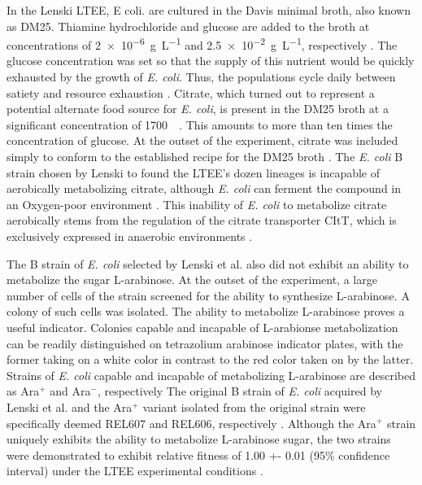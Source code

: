In the Lenski LTEE, E coli. are cultured in the Davis minimal broth, also known as DM25. 
Thiamine hydrochloride and glucose are added to the broth at 
concentrations of \SI{2e-6}{\gram\per\liter} and \SI{2.5e-2}{\gram\per\liter}, respectively \cite{Lenski1991Long-TermGenerations}. 
The glucose concentration was set so that the supply of this nutrient would be quickly exhausted by the growth of \textit{E. coli}.
Thus, the populations cycle daily between satiety and resource exhaustion \cite{Blount2016AContingency}.
Citrate, which turned out to represent a potential alternate food source for \textit{E. coli}, is present in the DM25 broth at a significant concentration of \SI{1700}{\micro\Molar}.
This amounts to more than ten times the concentration of glucose.
At the outset of the experiment, citrate was included simply  to conform to the established recipe for the DM25 broth \cite{Blount2016AContingency}.
The \textit{E. coli} B strain chosen by Lenski to found the LTEE's dozen lineages is incapable of aerobically metabolizing citrate, although \textit{E. coli} can ferment the compound in an Oxygen-poor environment \cite{Blount2016AContingency}.
This inability of \textit{E. coli} to metabolize citrate aerobically stems from the regulation of the citrate transporter CItT, which is exclusively expressed in anaerobic environments \cite{Pos1998TheChloroplasts}.

The B strain of \textit{E. coli} selected by Lenski et al. also did not exhibit an ability to metabolize the sugar L-arabinose.
At the outset of the experiment, a large number of cells of the strain screened for the ability to synthesize L-arabinose.
A colony of such cells was isolated.
The ability to metabolize L-arabinose proves a useful indicator.
Colonies capable and incapable of L-arabionse metabolization can be readily distinguished on tetrazolium arabinose indicator plates, with the former taking on a white color in contrast to the red color taken on by the latter.
Strains of \textit{E. coli} capable and incapable of metabolizing L-arabinose are described as Ara$^+$ and Ara$^-$, respectively \cite{Lenski1991Long-TermGenerations}
The original B strain of \textit{E. coli} acquired by Lenski et al. and the Ara$^+$ variant isolated from the original strain were specifically deemed REL607 and REL606, respectively \cite{Lenski2017TheSite}.
Although the Ara$^+$ strain uniquely exhibits the ability to metabolize L-arabinose sugar, the two strains were demonstrated to exhibit relative fitness of 1.00 +- 0.01 (95\% confidence interval) under the LTEE experimental conditions \cite{Lenski1988ExperimentalT4}.


